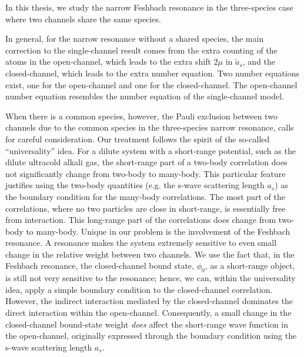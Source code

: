 % 
In this thesis, we study the narrow Feshbach resonance in  the three-species case where two channels share the same species.  

In general, for the narrow resonance without a shared species, the main correction to the single-channel result comes from the  extra counting of the atoms in the open-channel, which leads to the extra shift $2\mu$ in $\tilde{a}_{s}$, and the closed-channel, which leads to the extra number equation.  Two number equations exist, one for the open-channel and one for the closed-channel.  The open-channel number equation resembles the number equation of the single-channel model.

When there is a common species,  however, the  Pauli exclusion between two channels due to the common species in the three-species narrow resonance, calls for careful  consideration.  Our treatment follows the spirit of the so-called ``universality'' idea.  For a dilute system with a short-range potential, such as the dilute ultracold alkali gas, the short-range part of a two-body correlation does not significantly change from two-body  to many-body.  This particular feature justifies using the two-body quantities (e.g. the s-wave scattering length $a_{s}$) as the boundary condition for the many-body correlations.  The most part of the correlations, where no two particles are close in short-range, is essentially free from interaction. This long-range part of the correlations does change from two-body to many-body.  Unique in our problem is the involvement of the Feshbach resonance.  A resonance makes the system extremely sensitive to even small change in the relative weight between two channels. We use the fact that,  in the Feshbach resonance, the closed-channel bound state, $\phi_{0}$, as a short-range object,  is still not very sensitive to the resonance; hence, we can, within the universality idea,  apply a simple boundary condition to the closed-channel correlation. However, the indirect interaction mediated by the closed-channel dominates the direct interaction within the open-channel. Consequently, a small change in the closed-channel bound-state weight \emph{does} affect the short-range wave function in the open-channel, originally expressed through the boundary condition using the s-wave scattering length $a_{s}$. 

